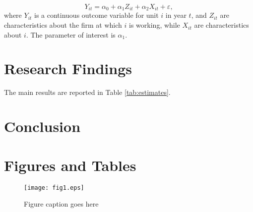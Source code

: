 \documentclass[12pt,english]{article}
\begin{document}
\begin{equation}
\label{eq:1}
Y_{it}=\alpha_{0} + \alpha_{1}Z_{it} + \alpha_{2} X_{it} + \varepsilon,
\end{equation}
where $Y_{it}$ is a continuous outcome variable for unit $i$ in year $t$, and $Z_{it}$ are characteristics about the firm at which $i$ is working, while $X_{it}$ are characteristics about $i$. The parameter of interest is $\alpha_{1}$.

\lipsum[1-6]

\section{Research Findings}\label{sec:results}
The main results are reported in Table \ref{tab:estimates}.

\lipsum[3-9]

\section{Conclusion}\label{sec:conclusion}
\lipsum[3-4]

\vfill
\pagebreak{}
\begin{spacing}{1.0}


\end{spacing}

\vfill
\pagebreak{}
\clearpage

\section*{Figures and Tables}\label{sec:figTables}
\begin{figure}[ht]
\centering
\bigskip{}
\texttt{[image: fig1.eps]}
\caption{Figure caption goes here}
\label{fig:fig1}
\end{figure}
\end{document}

